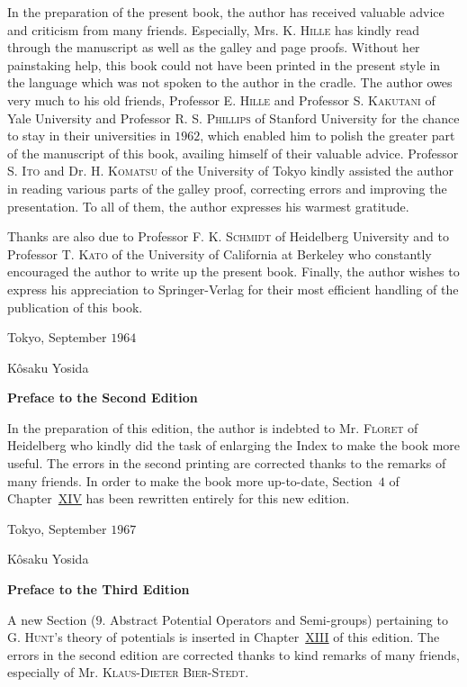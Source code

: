 In the preparation of the present book, the author has received valuable advice and criticism from many friends. Especially, Mrs. K. \textsc{Hille} has kindly read through the manuscript as well as the galley and page proofs. Without her painstaking help, this book could not have been printed in the present style in the language which was not spoken to the author in the cradle. The author owes very much to his old friends, Professor E. \textsc{Hille} and Professor S. \textsc{Kakutani} of Yale University and Professor R. S. \textsc{Phillips} of Stanford University for the chance to stay in their universities in $1962$, which enabled him to polish the greater part of the manuscript of this book, availing himself of their valuable advice. Professor S. \textsc{Ito} and Dr. H. \textsc{Komatsu} of the University of Tokyo kindly assisted the author in reading various parts of the galley proof, correcting errors and improving the presentation. To all of them, the author expresses his warmest gratitude. 

Thanks are also due to Professor F. K. \textsc{Schmidt} of Heidelberg University and to Professor T. \textsc{Kato} of the University of California at Berkeley who constantly encouraged the author to write up the present book. Finally, the author wishes to express his appreciation to Springer-Verlag for their most efficient handling of the publication of this book. 

Tokyo, September $1964$ 

Kôsaku Yosida 

\vspace{6mm}\begin{center}\bfseries Preface to the Second Edition\end{center}\vspace{2mm}
In the preparation of this edition, the author is indebted to Mr. \textsc{Floret} of Heidelberg who kindly did the task of enlarging the Index to make the book more useful. The errors in the second printing are corrected thanks to the remarks of many friends. In order to make the book more up-to-date, Section~\hyperref[sec:XIV.4]{$4$} of Chapter~\hyperref[chap:XIV]{XIV} has been rewritten entirely for this new edition. 

Tokyo, September $1967$ 

Kôsaku Yosida 

\vspace{6mm}\begin{center}\bfseries Preface to the Third Edition\end{center}\vspace{2mm}
A new Section ($9$. Abstract Potential Operators and Semi-groups) pertaining to G. \textsc{Hunt}'s theory of potentials is inserted in Chapter~\hyperref[chap:XIII]{XIII} of this edition. The errors in the second edition are corrected thanks to kind remarks of many friends, especially of Mr. \textsc{Klaus-Dieter Bier-Stedt}. 

